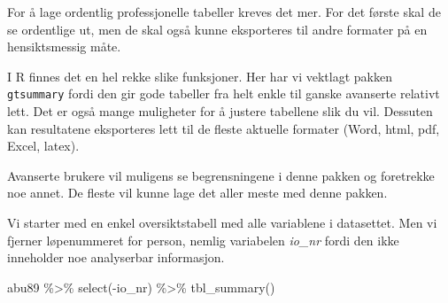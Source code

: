 \documentclass[
  norsk,
  letterpaper,
  DIV=11,
  numbers=noendperiod]{scrreprt}
\newenvironment{Shaded}{\begin{snugshade}}{\end{snugshade}}
\newcommand{\FunctionTok}[1]{\textcolor[rgb]{0.28,0.35,0.67}{#1}}
\newcommand{\NormalTok}[1]{\textcolor[rgb]{0.00,0.23,0.31}{#1}}
\newcommand{\SpecialCharTok}[1]{\textcolor[rgb]{0.37,0.37,0.37}{#1}}
\theoremstyle{definition}
\theoremstyle{remark}
\begin{document}
For å lage ordentlig professjonelle tabeller kreves det mer. For det
første skal de se ordentlige ut, men de skal også kunne eksporteres til
andre formater på en hensiktsmessig måte.

I R finnes det en hel rekke slike funksjoner. Her har vi vektlagt pakken
\texttt{gtsummary} fordi den gir gode tabeller fra helt enkle til ganske
avanserte relativt lett. Det er også mange muligheter for å justere
tabellene slik du vil. Dessuten kan resultatene eksporteres lett til de
fleste aktuelle formater (Word, html, pdf, Excel, latex).

Avanserte brukere vil muligens se begrensningene i denne pakken og
foretrekke noe annet. De fleste vil kunne lage det aller meste med denne
pakken.

Vi starter med en enkel oversiktstabell med alle variablene i
datasettet. Men vi fjerner løpenummeret for person, nemlig variabelen
\emph{io\_nr} fordi den ikke inneholder noe analyserbar informasjon.

\begin{Shaded}
\begin{Highlighting}[]
\NormalTok{abu89 }\SpecialCharTok{\%\textgreater{}\%} 
  \FunctionTok{select}\NormalTok{(}\SpecialCharTok{{-}}\NormalTok{io\_nr) }\SpecialCharTok{\%\textgreater{}\%} 
  \FunctionTok{tbl\_summary}\NormalTok{()}
\end{Highlighting}
\end{Shaded}
\end{document}
